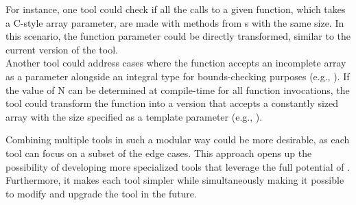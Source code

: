 For instance, one tool could check if all the calls to a given function, which takes a C-style array parameter, are made with  methods from s with the same size. In this scenario, the function parameter could be directly transformed, similar to the current version of the tool.\\
Another tool could address cases where the function accepts an incomplete array as a parameter alongside an integral type for bounds-checking purposes (e.g., ).
If the value of N can be determined at compile-time for all function invocations, the tool could transform the function into a version that accepts a constantly sized array with the size specified as a template parameter (e.g., ).

Combining multiple tools in such a modular way could be more desirable, as each tool can focus on a subset of the edge cases. This approach opens up the possibility of developing more specialized tools that leverage the full potential of .
Furthermore, it makes each tool simpler while simultaneously making it possible to modify and upgrade the tool in the future.
